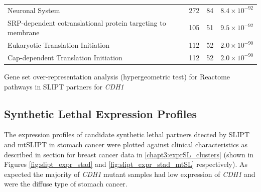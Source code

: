 \begin{table}[!ht]
{\begin{threeparttable}
\begin{tabular}{lccc}
  \rowcolor{black!10}
  Neuronal System & 272 &  84 & $8.4 \times 10^{-92}$ \\ 
  \rowcolor{black!5}
  SRP-dependent cotranslational protein targeting to membrane & 105 &  51 & $9.5 \times 10^{-92}$ \\ 
  \rowcolor{black!10}
  Eukaryotic Translation Initiation & 112 &  52 & $2.0 \times 10^{-90}$ \\ 
  \rowcolor{black!5}
  Cap-dependent Translation Initiation & 112 &  52 & $2.0 \times 10^{-90}$ \\ 
   \hline
\end{tabular}
\begin{tablenotes}
\raggedright \small
Gene set over-representation analysis (hypergeometric test) for Reactome pathways in SLIPT partners for \textit{CDH1}
\end{tablenotes}
\end{threeparttable}
}
\end{table}



\FloatBarrier

\subsection{Synthetic Lethal Expression Profiles} \label{chapt3:stad_SL_clusters}

The expression profiles of candidate synthetic lethal partners dtected by SLIPT and mtSLIPT in stomach cancer were plotted against clinical characteristics as described in section for breast cancer data in \ref{chapt3:exprSL_clusters} (shown in Figures \ref{fig:slipt_expr_stad} and \ref{fig:slipt_expr_stad_mtSL} respectively). As expected the majority of \textit{CDH1} mutant samples had low expression of \textit{CDH1} and were the diffuse type of stomach cancer.



